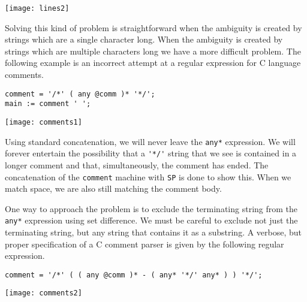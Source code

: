 \documentclass[letterpaper,11pt,oneside]{book}
\newcommand{\graphspace}{\vspace{10pt}}
\newenvironment{inline_code}{\def\baselinestretch{1}\vspace{12pt}\small}{}
\begin{document}
\begin{center}
\texttt{[image: lines2]}
\end{center}
\graphspace

Solving this kind of problem is straightforward when the ambiguity is created
by strings which are a single character long.  When the ambiguity is created by
strings which are multiple characters long we have a more difficult problem.
The following example is an incorrect attempt at a regular expression for C
language comments. 

\begin{inline_code}
\begin{verbatim}
comment = '/*' ( any @comm )* '*/';
main := comment ' ';
\end{verbatim}
\end{inline_code}

\begin{center}
\texttt{[image: comments1]}
\end{center}
\graphspace

Using standard concatenation, we will never leave the \verb|any*| expression.
We will forever entertain the possibility that a \verb|'*/'| string that we see
is contained in a longer comment and that, simultaneously, the comment has
ended.  The concatenation of the \verb|comment| machine with \verb|SP| is done
to show this. When we match space, we are also still matching the comment body.

One way to approach the problem is to exclude the terminating string
from the \verb|any*| expression using set difference. We must be careful to
exclude not just the terminating string, but any string that contains it as a
substring. A verbose, but proper specification of a C comment parser is given
by the following regular expression. 

\begin{inline_code}
\begin{verbatim}
comment = '/*' ( ( any @comm )* - ( any* '*/' any* ) ) '*/';
\end{verbatim}
\end{inline_code}

\graphspace
\begin{center}
\texttt{[image: comments2]}
\end{center}
\graphspace
\end{document}

